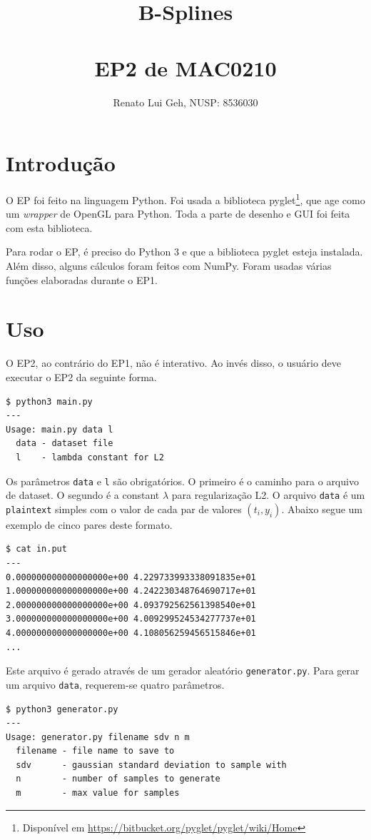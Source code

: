 \documentclass[12pt]{article}
\title{%
  B-Splines\\~\\
  {\normalfont EP2 de MAC0210}
}
\author{Renato Lui Geh, NUSP: 8536030}
\date{}
\theoremstyle{plain}
\numberwithin{equation}{section}
\newcommand{\code}[1]{\lstinline[mathescape=true]{#1}}
\begin{document}
\maketitle

\section{Introdução}

O EP foi feito na linguagem Python. Foi usada a biblioteca pyglet\footnote{Disponível em
\url{https://bitbucket.org/pyglet/pyglet/wiki/Home}}, que age como um \textit{wrapper} de OpenGL
para Python. Toda a parte de desenho e GUI foi feita com esta biblioteca.

Para rodar o EP, é preciso do Python 3 e que a biblioteca pyglet esteja instalada. Além disso,
alguns cálculos foram feitos com NumPy. Foram usadas várias funções elaboradas durante o EP1.

\section{Uso}

O EP2, ao contrário do EP1, não é interativo. Ao invés disso, o usuário deve executar o EP2 da
seguinte forma.
\begin{lstlisting}[numbers=none]
$ python3 main.py
---
Usage: main.py data l
  data - dataset file
  l    - lambda constant for L2
\end{lstlisting}

Os parâmetros \code{data} e \code{l} são obrigatórios. O primeiro é o caminho para o arquivo de
dataset. O segundo é a constant $\lambda$ para regularização L2. O arquivo \code{data} é um
\code{plaintext} simples com o valor de cada par de valores $(t_i,y_i)$.  Abaixo segue um exemplo
de cinco pares deste formato.

\begin{lstlisting}[numbers=none]
$ cat in.put
---
0.000000000000000000e+00 4.229733993338091835e+01
1.000000000000000000e+00 4.242230348764690717e+01
2.000000000000000000e+00 4.093792562561398540e+01
3.000000000000000000e+00 4.009299524534277737e+01
4.000000000000000000e+00 4.108056259456515846e+01
...
\end{lstlisting}

Este arquivo é gerado através de um gerador aleatório \code{generator.py}. Para gerar um arquivo
\code{data}, requerem-se quatro parâmetros.

\begin{lstlisting}[numbers=none]
$ python3 generator.py
---
Usage: generator.py filename sdv n m
  filename - file name to save to
  sdv      - gaussian standard deviation to sample with
  n        - number of samples to generate
  m        - max value for samples
\end{lstlisting}
\end{document}
